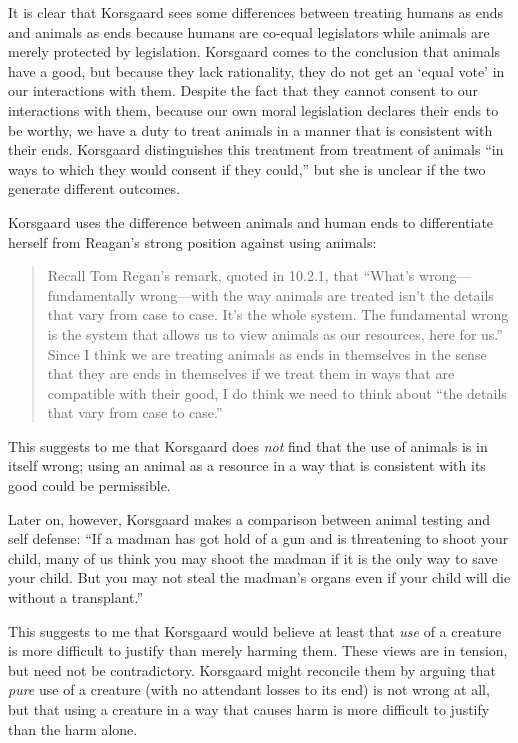 		It is clear that Korsgaard sees some differences between treating
		humans as ends and animals as ends because humans are co-equal
		legislators while animals are merely protected by legislation.
		Korsgaard comes to the conclusion that animals have a good, but because
		they lack rationality, they do not get an ‘equal vote’ in our
		interactions with them.\autocite[12.2.1]{korsgaard_fellow_creatures}
		Despite the fact that they cannot consent to our interactions with
		them, because our own moral legislation declares their ends to be
		worthy, we have a duty to treat animals in a manner that is consistent
		with their ends.\autocite[12.2.1]{korsgaard_fellow_creatures} Korsgaard
		distinguishes this treatment from treatment of animals “in ways to
		which they would consent if they could,” but she is unclear if the two
		generate different
		outcomes.\autocite[12.2.1]{korsgaard_fellow_creatures}

		Korsgaard uses the difference between animals and human ends to
		differentiate herself from Reagan’s strong position against using
		animals:
		\begin{quote}
			Recall Tom Regan’s remark, quoted in 10.2.1, that “What’s
			wrong— fundamentally wrong—with the way animals are treated isn’t
			the details that vary from case to case. It’s the whole system. The
			fundamental wrong is the system that allows us to view animals as
			our resources, here for us.” Since I think we are treating animals
			as ends in themselves in the sense that they are ends in themselves
			if we treat them in ways that are compatible with their good, I do
			think we need to think about “the details that vary from case to
			case.”\autocite[12.2.1]{korsgaard_fellow_creatures}
		\end{quote}
		This suggests to me that Korsgaard does \emph{not} find that the use of
		animals is in itself wrong; using an animal as a resource in a way that
		is consistent with its good could be permissible.

		Later on, however, Korsgaard makes a comparison between animal testing
		and self defense: “If a madman has got hold of a gun and is threatening
		to shoot your child, many of us think you may shoot the madman if it is
		the only way to save your child. But you may not steal the madman’s
		organs even if your child will die without a
		transplant.”\autocite[12.5.2]{korsgaard_fellow_creatures}

		This suggests to me that Korsgaard would believe at least that
		\emph{use} of a creature is more difficult to justify than merely
		harming them. These views are in tension, but need not be
		contradictory.  Korsgaard might reconcile them by arguing that
		\emph{pure} use of a creature (with no attendant losses to its end) is
		not wrong at all, but that using a creature in a way that causes harm
		is more difficult to justify than the harm alone.

